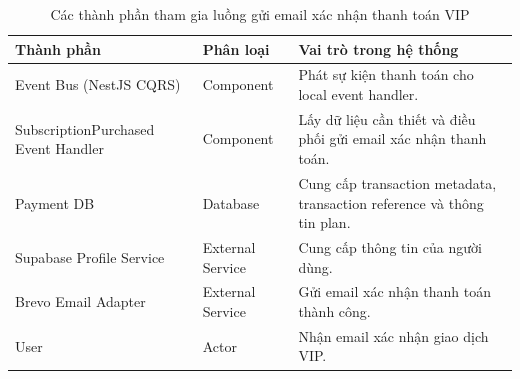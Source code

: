 \begin{table}[H]
\centering
\renewcommand{\arraystretch}{1.3}

\begin{tabular}{|l|l|p{5cm}|}
\hline
\textbf{Thành phần} & \textbf{Phân loại} & \textbf{Vai trò trong hệ thống} \\ \hline
Event Bus (NestJS CQRS) & Component & Phát sự kiện thanh toán cho local event handler. \\ \hline
SubscriptionPurchased Event Handler & Component & Lấy dữ liệu cần thiết và điều phối gửi email xác nhận thanh toán. \\ \hline
Payment DB & Database & Cung cấp transaction metadata, transaction reference và thông tin plan. \\ \hline
Supabase Profile Service & External Service & Cung cấp thông tin của người dùng. \\ \hline
Brevo Email Adapter & External Service & Gửi email xác nhận thanh toán thành công. \\ \hline
User & Actor & Nhận email xác nhận giao dịch VIP. \\ \hline
\end{tabular}
\caption{Các thành phần tham gia luồng gửi email xác nhận thanh toán VIP}
\end{table}
